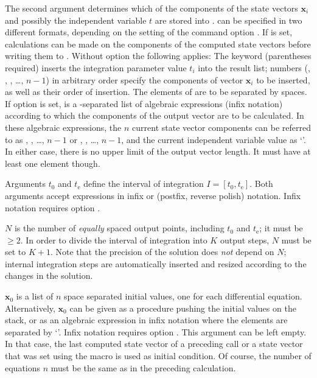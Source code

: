 \documentclass[11pt,english,BCOR10mm,DIV12,bibliography=totoc,parskip=false,smallheadings
    headexclude,footexclude,oneside,dvips,UKenglish]{pst-doc}
\begin{document}
The second argument  determines which of the components of the state vectors $\mathbf{x}_i$ and possibly the independent variable $t$ are stored into .  can be specified in two different formats, depending on the setting of the command option .
If  is set, calculations can be made on the components of the computed state vectors before writing them to . Without option  the following applies: The keyword  (parentheses required) inserts the integration parameter value $t_i$ into the result list; numbers (, , , \dots, $n-1$) in arbitrary order specify the components of vector $\mathbf{x}_i$ to be inserted, as well as their order of insertion. The elements of  are to be separated by spaces. If option  is set,  is a \Lkeyword{|}-separated list of algebraic expressions (infix notation) according to which the components of the output vector are to be calculated. In these algebraic expressions, the $n$ current state vector components can be referred to as , , \dots, \Lkeyword{x[}$n-1$\Lkeyword{]} or , , \dots, \Lkeyword{y[}$n-1$\Lkeyword{]}, and the current independent variable value as `'. In either case, there is no upper limit of the output vector length. It must have at least one element though.

Arguments $t_0$ and $t_\mathrm{e}$ define the interval of integration $I=[t_0, t_\mathrm{e}]$. Both arguments accept expressions in infix or \PS{} (postfix, reverse polish) notation. Infix notation requires option .

$N$ is the number of \emph{equally} spaced output points, including $t_0$ and $t_\mathrm{e}$; it must be $\ge 2$. In order to divide the interval of integration into $K$ output steps, $N$ must be set to $K+1$. Note that the precision of the solution does \emph{not} depend on $N$; internal integration steps are automatically inserted and resized according to the changes in the solution.

$\mathbf{x}_0$ is a list of $n$ space separated initial values, one for each differential equation. Alternatively, $\mathbf{x}_0$ can be given as a \PS{} procedure pushing the initial values on the stack, or as an algebraic expression in infix notation where the elements are separated by `\Lkeyword{|}'. Infix notation requires option . This argument can be left empty. In that case, the last computed state vector of a preceding  call or a state vector that was set using the  macro is used as initial condition. Of course, the number of equations $n$ must be the same as in the preceding calculation.
\end{document}
